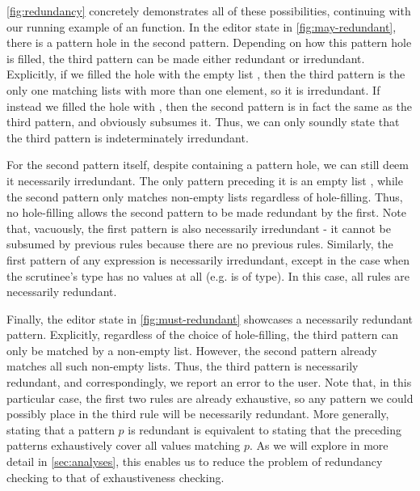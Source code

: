\autoref{fig:redundancy} concretely demonstrates all of these possibilities, continuing with our running example of an  function. In the editor state in \autoref{fig:may-redundant}, there is a pattern hole in the second pattern. Depending on how this pattern hole is filled, the third pattern can be made either redundant or irredundant. Explicitly, if we filled the hole with the empty list \li{[]}, then the third pattern is the only one matching lists with more than one element, so it is irredundant. If instead we filled the hole with , then the second pattern is in fact the same as the third pattern, and obviously subsumes it. Thus, we can only soundly state that the third pattern is indeterminately irredundant.

For the second pattern itself, despite containing a pattern hole, we can still deem it necessarily irredundant. The only pattern preceding it is an empty list \li{[]}, while the second pattern only matches non-empty lists regardless of hole-filling. Thus, no hole-filling allows the second pattern to be made redundant by the first. Note that, vacuously, the first pattern is also necessarily irredundant - it cannot be subsumed by previous rules because there are no previous rules. Similarly, the first pattern of any  expression is necessarily irredundant, except in the case when the scrutinee's type has no values at all (e.g. is of  type). In this case, all rules are necessarily redundant.

Finally, the editor state in \autoref{fig:must-redundant} showcases a necessarily redundant pattern. Explicitly, regardless of the choice of hole-filling, the third pattern can only be matched by a non-empty list. However, the second pattern already matches all such non-empty lists. Thus, the third pattern is necessarily redundant, and correspondingly, we report an error to the user. Note that, in this particular case, the first two rules are already exhaustive, so any pattern we could possibly place in the third rule will be necessarily redundant. More generally, stating that a pattern $p$ is redundant is equivalent to stating that the preceding patterns exhaustively cover all values matching $p$. As we will explore in more detail in \autoref{sec:analyses}, this enables us to reduce the problem of redundancy checking to that of exhaustiveness checking.
